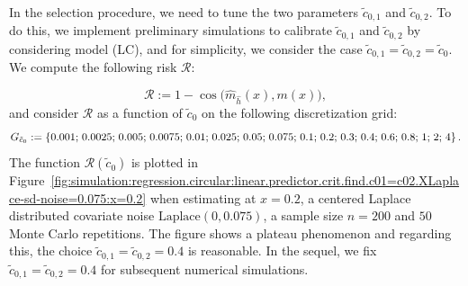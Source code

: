\documentclass[11pt,a4paper,openany]{article}
\begin{document}
In the selection procedure, we need to tune the two parameters $\tilde c_{0,1}$ and $\tilde c_{0,2}$. %
To do this, we implement preliminary simulations to calibrate $\tilde c_{0,1}$ and $\tilde c_{0,2}$ by  considering model (LC), 
and for simplicity,  we consider the case $\tilde c_{0,1} = \tilde c_{0,2} = \tilde c_{0}$. We compute the following risk $\mathcal{R}$:

\begin{equation}\label{def:risk}
	\mathcal{R} := 1 - \cos \big( \widehat{m}_{\widehat{h}}(x) , m(x) \big), 
\end{equation}
and consider $\mathcal{R}$ as a function of $\tilde c_{0}$ on the following discretization grid:
\begin{equation*}
	G_{\tilde c_0} := \left\{ 0.001 ; \hspace{0.05cm} 0.0025; \hspace{0.05cm} 0.005; \hspace{0.05cm} 0.0075; \hspace{0.05cm} 0.01; \hspace{0.05cm} 0.025; \hspace{0.05cm} 0.05; \hspace{0.05cm} 0.075 ; \hspace{0.05cm} 0.1 ; \hspace{0.05cm} 0.2 ; \hspace{0.05cm} 0.3 ; \hspace{0.05cm} 0.4 ; \hspace{0.05cm} 0.6 ; \hspace{0.05cm} 0.8 ; \hspace{0.05cm} 1 ; \hspace{0.05cm} 2  ; \hspace{0.05cm} 4  \right\}.
\end{equation*}
The function $\mathcal{R}(\tilde c_0)$ is plotted  in Figure~\ref{fig:simulation:regression.circular:linear.predictor.crit.find.c01=c02.XLaplace-sd-noise=0.075:x=0.2} when estimating at $x = 0.2$, a centered Laplace distributed covariate noise $\textrm{Laplace}(0, 0.075)$, a sample size $n=200$ and $50$ Monte Carlo repetitions. The figure shows a plateau phenomenon and regarding this, the choice $\tilde c_{0,1} = \tilde c_{0,2} = 0.4$ is reasonable. In the sequel, we fix $\tilde c_{0,1} = \tilde c_{0,2} = 0.4$ for subsequent numerical simulations. 
\end{document}
